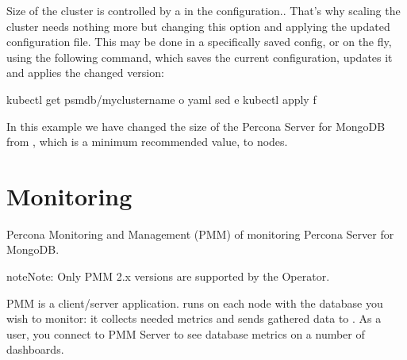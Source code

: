 \documentclass[letterpaper,10pt,english]{sphinxmanual}
\begin{document}
Size of the cluster is controlled by a {\hyperref[\detokenize{operator:replsets-size}]{}} in the {\hyperref[\detokenize{operator:operator-custom-resource-options}]{}} configuration.. That’s why scaling the cluster needs
nothing more but changing this option and applying the updated
configuration file. This may be done in a specifically saved config, or
on the fly, using the following command, which saves the current
configuration, updates it and applies the changed version:

\begin{sphinxVerbatim}[commandchars=\\\{\}]
\PYGZdl{} kubectl get psmdb/my\PYGZhy{}cluster\PYGZhy{}name \PYGZhy{}o yaml  sed \PYGZhy{}e   kubectl apply \PYGZhy{}f \PYGZhy{}
\end{sphinxVerbatim}

In this example we have changed the size of the Percona Server for
MongoDB from , which is a minimum recommended value, to 
nodes.

 


\chapter{Monitoring}
\label{\detokenize{monitoring:monitoring}}\label{\detokenize{monitoring:operator-monitoring}}\label{\detokenize{monitoring::doc}}
Percona Monitoring and Management (PMM) 
of monitoring Percona Server for MongoDB.

\begin{sphinxadmonition}{note}{Note:}
Only PMM 2.x versions are supported by the Operator.
\end{sphinxadmonition}

PMM is a client/server application.  runs on each node with the
database you wish to monitor: it collects needed metrics and sends gathered data
to . As a user, you connect to PMM Server to see database metrics on
a number of dashboards.
\end{document}
